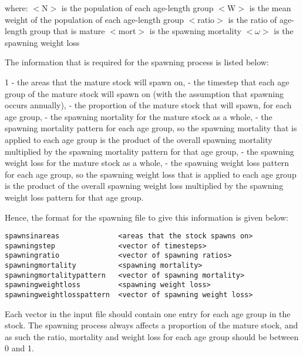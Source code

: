 \documentclass [a4paper, 10pt]{book}
\begin{document}
where:\newline
$<$N$>$ is the population of each age-length group\newline
$<$W$>$ is the mean weight of the population of each age-length group\newline
$<$ratio$>$ is the ratio of age-length group that is mature\newline
$<$mort$>$ is the spawning mortality\newline
$<$$\omega$$>$ is the spawning weight loss

\bigskip
The information that is required for the spawning process is listed below:\newline

1 - the areas that the mature stock will spawn on, - the timestep that each age group of the mature stock will spawn on (with the assumption that spawning occurs annually), - the proportion of the mature stock that will spawn, for each age group, - the spawning mortality for the mature stock as a whole, - the spawning mortality pattern for each age group, so the spawning mortality that is applied to each age group is the product of the overall spawning mortality multiplied by the spawning mortality pattern for that age group, - the spawning weight loss for the mature stock as a whole, - the spawning weight loss pattern for each age group, so the spawning weight loss that is applied to each age group is the product of the overall spawning weight loss multiplied by the spawning weight loss pattern for that age group.

\bigskip
Hence, the format for the spawning file to give this information is given below:

\begin{verbatim}
spawnsinareas              <areas that the stock spawns on>
spawningstep               <vector of timesteps>
spawningratio              <vector of spawning ratios>
spawningmortality          <spawning mortality>
spawningmortalitypattern   <vector of spawning mortality>
spawningweightloss         <spawning weight loss>
spawningweightlosspattern  <vector of spawning weight loss>
\end{verbatim}

Each vector in the input file should contain one entry for each age group in the stock.  The spawning process always affects a proportion of the mature stock, and as such the ratio, mortality and weight loss for each age group should be between 0 and 1.
\end{document}
